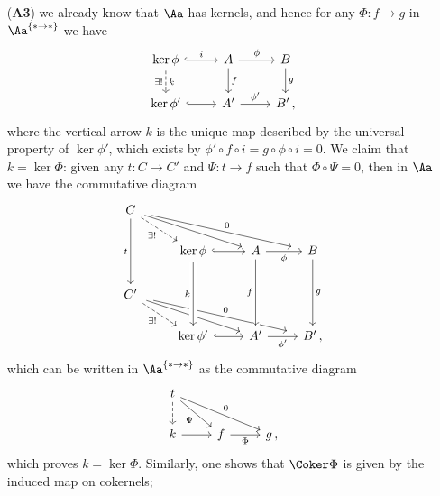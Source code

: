 \begin{ex}
\begin{itemize}
        \item[(\textbf{A3})] we already know that $\Aa$ has kernels, 
        and hence for any $\Phi:f \to g$ in 
        $\Aa^{\{\ast \to \ast\}}$ we have
        \begin{equation*}
            \begin{tikzcd}
                \ker \phi \ar[r, "i", hook] \ar[d, "\exists !"', "k", dashed]
                & A \ar[r, "\phi"] \ar[d, "f"] 
                & B \ar[d, "g"] \\
                \ker \phi' \ar[r, hook]
                & A' \ar[r, "\phi'"]
                & B'\,,
            \end{tikzcd}
        \end{equation*}
        where the vertical arrow $k$ is the unique map
        described by the universal property of $\ker \phi'$,
        which exists by $\phi' \circ f \circ i 
        = g \circ \phi \circ i = 0$.
        We claim that $k = \ker \Phi$: given any $t:C \to C'$
        and $\Psi:t \to f$ such that $\Phi \circ \Psi = 0$,
        then in $\Aa$ we have the commutative diagram
        \begin{equation*}
            \begin{tikzcd}
C \arrow[rrd, shorten=1mm] \arrow[rrrd, "0", shorten=3mm] \arrow[rd, "\exists !"', dashed] \arrow[dd, "t"'] &                                            &                                       &                   \\
                                                                                  & \ker \phi \arrow[r, hook]  & A \arrow[r, "\phi"']  & B \arrow[dd, "g"] \\
C' \arrow[rrd, shorten=1mm] \arrow[rrrd, "0", shorten=3mm] \arrow[rd, "\exists !"', dashed]                 &                                            &                                       &                   \\
                                                                                  & \ker \phi' \arrow[from=uu, "k"', crossing over] \arrow[r, hook]                 & A' \arrow[from=uu, "f"', crossing over]\arrow[r, "\phi'"']                & B'     \,,          
\end{tikzcd}
        \end{equation*}
        which can be written in $\Aa^{\{\ast \to \ast\}}$ as the commutative diagram
        \begin{equation*}
            \begin{tikzcd}
                t \ar[rd, "\Psi"'] \ar[rrd, "0"] \ar[d, dashed] & & \\
                k \ar[r] & f \ar[r, "\Phi"'] & g\,,
            \end{tikzcd}
        \end{equation*}
        which proves $k = \ker \Phi$. 
        Similarly, one shows that $\Coker \Phi$ is given by the induced map
        on cokernels;
        

\end{itemize}
\end{ex}
